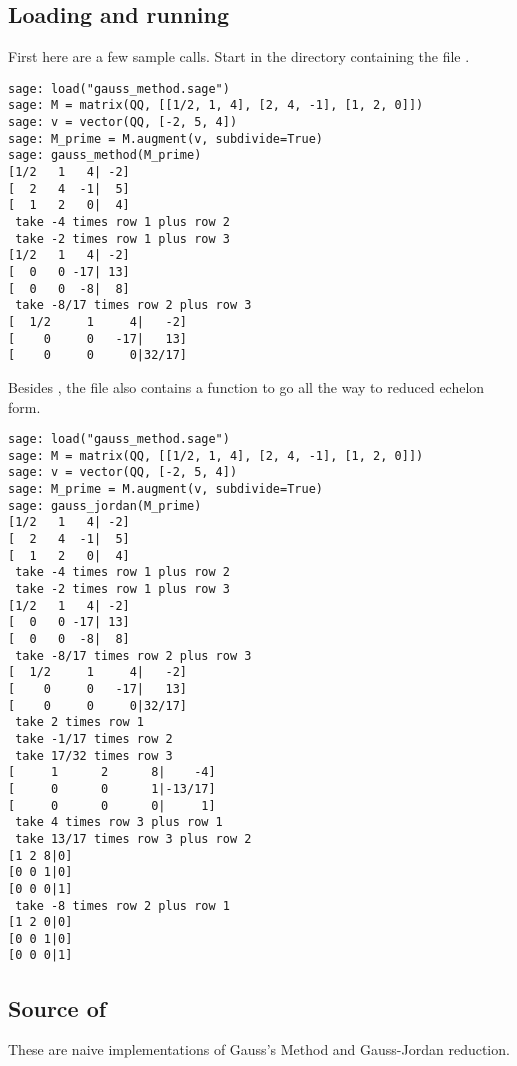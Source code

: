 \subsection{Loading and running}
First here are a few sample calls.
Start \Sage{} in the directory containing the file .
\begin{lstlisting}
sage: load("gauss_method.sage")                                                 
sage: M = matrix(QQ, [[1/2, 1, 4], [2, 4, -1], [1, 2, 0]])                      
sage: v = vector(QQ, [-2, 5, 4])                                                
sage: M_prime = M.augment(v, subdivide=True)                                    
sage: gauss_method(M_prime)                                                     
[1/2   1   4| -2]
[  2   4  -1|  5]
[  1   2   0|  4]
 take -4 times row 1 plus row 2
 take -2 times row 1 plus row 3
[1/2   1   4| -2]
[  0   0 -17| 13]
[  0   0  -8|  8]
 take -8/17 times row 2 plus row 3
[  1/2     1     4|   -2]
[    0     0   -17|   13]
[    0     0     0|32/17]
\end{lstlisting}

Besides \!, the file also contains a 
 function
to go all the way to reduced echelon form.
\begin{lstlisting}
sage: load("gauss_method.sage")                                                 
sage: M = matrix(QQ, [[1/2, 1, 4], [2, 4, -1], [1, 2, 0]])                      
sage: v = vector(QQ, [-2, 5, 4])                                                
sage: M_prime = M.augment(v, subdivide=True)                                    
sage: gauss_jordan(M_prime)                                                     
[1/2   1   4| -2]
[  2   4  -1|  5]
[  1   2   0|  4]
 take -4 times row 1 plus row 2
 take -2 times row 1 plus row 3
[1/2   1   4| -2]
[  0   0 -17| 13]
[  0   0  -8|  8]
 take -8/17 times row 2 plus row 3
[  1/2     1     4|   -2]
[    0     0   -17|   13]
[    0     0     0|32/17]
 take 2 times row 1
 take -1/17 times row 2
 take 17/32 times row 3
[     1      2      8|    -4]
[     0      0      1|-13/17]
[     0      0      0|     1]
 take 4 times row 3 plus row 1
 take 13/17 times row 3 plus row 2
[1 2 8|0]
[0 0 1|0]
[0 0 0|1]
 take -8 times row 2 plus row 1
[1 2 0|0]
[0 0 1|0]
[0 0 0|1]
\end{lstlisting}



\subsection{Source of \protect{}}

These are naive implementations of Gauss's Method and 
Gauss-Jordan reduction.


\endinput


TODO:
